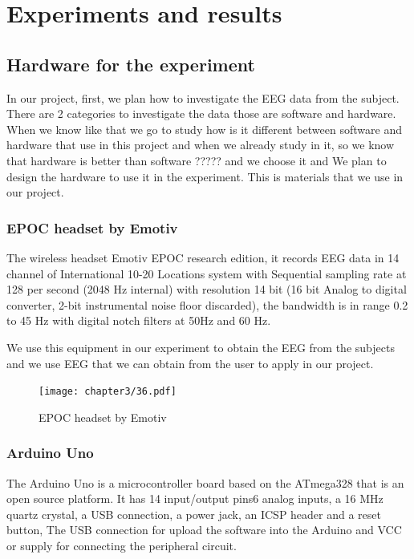 \chapter{Experiments and results}

\label{ch:Experiments and results}

\setlength{\parindent}{4em}
\setlength{\parskip}{1em}
\renewcommand{\baselinestretch}{1.5}

\section{Hardware for the experiment}

\hspace{1.5cm} In our project, first, we plan how to investigate the EEG data from the subject. There are 2 categories to investigate the data those are software and hardware. When we know like that we go to study how is it different between software and hardware that use in this project and when we already study in it, so we know that hardware is better than software ????? and we choose it and We plan to design the hardware to use it in the experiment. This is materials that we use in our project.

\subsection{EPOC headset by Emotiv\texttrademark}
\hspace{1.5cm} The wireless headset Emotiv EPOC research edition, it records EEG data in 14 channel of International 10-20 Locations system with Sequential sampling rate at 128 per second (2048 Hz internal) with resolution 14 bit (16 bit Analog to digital converter, 2-bit instrumental noise floor discarded), the bandwidth is in range 0.2 to 45 Hz with digital notch filters at 50Hz and 60 Hz.

We use this equipment in our experiment to obtain the EEG from the subjects and we use EEG that we can obtain from the user to apply in our project.
\begin{figure}[ht]
	\centering
	\texttt{[image: chapter3/36.pdf]}
	\caption{EPOC headset by Emotiv\texttrademark}
\end{figure}

\subsection{Arduino Uno}
\hspace{1.5cm} The Arduino Uno is a microcontroller board based on the ATmega328 that is an open source platform. It has 14 input/output pins6 analog inputs, a 16 MHz quartz crystal, a USB connection, a power jack, an ICSP header and a reset button, The USB connection for upload the software into the Arduino and VCC or supply for connecting the peripheral circuit.

